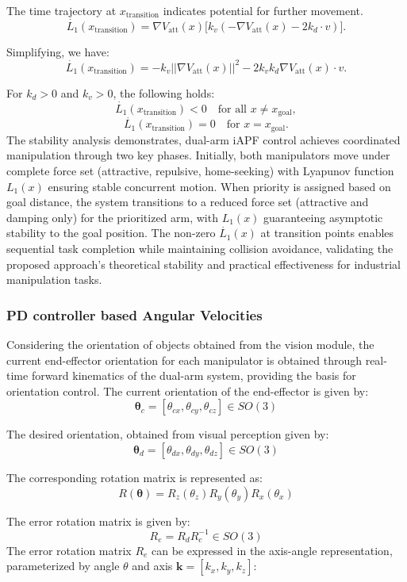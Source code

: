 \documentclass[utf8]{FrontiersinHarvard}
\begin{document}
\noindent The time trajectory at $x_{\text{transition}}$ indicates potential for further movement.
\[
\dot{L_{1}}(x_{\text{transition}}) = \nabla V_{\text{att}}(x) \big[k_{v}(-\nabla V_{\text{att}}(x) - 2k_{d} \cdot v)\big].
\]

\noindent Simplifying, we have:
\[
\dot{L_{1}}(x_{\text{transition}}) = -k_{v}||\nabla V_{\text{att}}(x)||^{2} - 2k_{v}k_{d}\nabla V_{\text{att}}(x) \cdot v.
\]

\noindent For $k_{d} > 0$ and $k_{v} > 0$, the following holds:
\[
\dot{L_{1}}(x_{\text{transition}}) < 0 \quad \text{for all } x \neq x_{\text{goal}},
\]
\[
\dot{L_{1}}(x_{\text{transition}}) = 0 \quad \text{for } x = x_{\text{goal}}.
\]
The stability analysis demonstrates, dual-arm iAPF control achieves coordinated manipulation through two key phases. Initially, both manipulators move under complete force set (attractive, repulsive, home-seeking) with Lyapunov function $L_{1}(x)$ ensuring stable concurrent motion. When priority is assigned based on goal distance, the system transitions to a reduced force set (attractive and damping only) for the prioritized arm, with $L_{1}(x)$ guaranteeing asymptotic stability to the goal position. The non-zero $\dot{L_{1}}(x)$ at transition points enables sequential task completion while maintaining collision avoidance, validating the proposed approach's theoretical stability and practical effectiveness for industrial manipulation tasks.

\subsubsection{PD controller based Angular Velocities}
Considering the orientation of objects obtained from the vision module, the current end-effector orientation for each manipulator is obtained through real-time forward kinematics of the dual-arm system, providing the basis for orientation control.
\noindent The current orientation of the end-effector is given by:
\[
\bm{\theta}_{c} = [\theta_{cx}, \theta_{cy}, \theta_{cz}] \in SO(3)
\]

\noindent The desired orientation, obtained from visual perception given by:
\[
\bm{\theta}_{d} = [\theta_{dx}, \theta_{dy}, \theta_{dz}] \in SO(3)
\]

\noindent The corresponding rotation matrix is represented as:
\[
R(\bm{\theta}) = R_{z}(\theta_{z}) R_{y}(\theta_{y}) R_{x}(\theta_{x})
\]

\noindent The error rotation matrix is given by:
\[
R_{e} = R_{d} R_{c}^{-1} \in SO(3)
\]
The error rotation matrix \( R_{e} \) can be expressed in the axis-angle representation, parameterized by angle \( \theta \) and  axis \( \bm{k} = [k_{x}, k_{y}, k_{z}] \):
\end{document}
